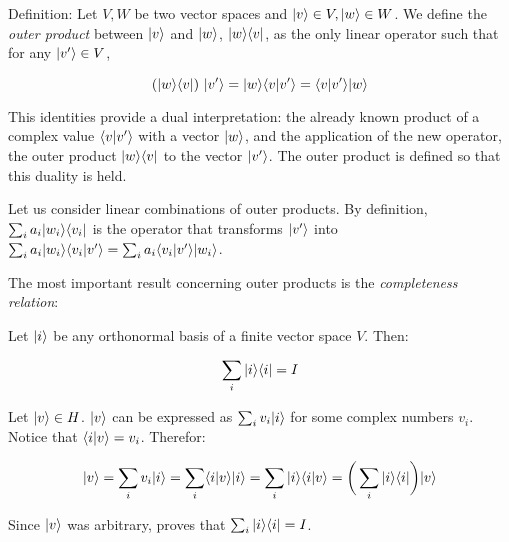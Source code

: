\begin{definition}
	Definition: Let $V, W$ be two vector spaces and $|v\rangle \in V, |w\rangle \in W$. We define the \emph{outer product} between $|v\rangle$ and $|w\rangle$, $|w\rangle\langle v|$, as the only linear operator such that for any $|v'\rangle \in V$, 
	
	$$ (|w\rangle\langle v|) \ |v'\rangle = |w\rangle\langle v|v'\rangle = \langle v|v'\rangle |w\rangle$$
\end{definition}

This identities provide a dual interpretation: the already known product of a complex value $\langle v|v'\rangle$ with a vector $|w\rangle$, and the application of the new operator, the outer product $|w\rangle\langle v|$ to the vector $|v'\rangle$. The outer product is defined so that this duality is held.

Let us consider linear combinations of outer products. By definition, $\sum_i a_i |w_i\rangle\langle v_i|$ is the operator that transforms $|v'\rangle$ into $\sum_i a_i |w_i\rangle\langle v_i|v'\rangle = \sum_i a_i \langle v_i|v'\rangle |w_i\rangle$.

The most important result concerning outer products is the \emph{completeness relation}:

\begin{proposition}
	Let $|i\rangle$ be any orthonormal basis of a finite vector space $V$. Then:
	
	$$ \sum_i |i\rangle\langle i| = I $$
\end{proposition}

\begin{proofs}
	Let $|v\rangle \in H$. $|v\rangle$ can be expressed as $ \sum_i v_i |i\rangle$ for some complex numbers $v_i$. Notice that $\langle i|v\rangle = v_i$. Therefor:
	
	$$|v\rangle = \sum_i v_i |i\rangle = \sum_i \langle i|v\rangle |i\rangle = \sum_i |i\rangle\langle i|v\rangle = \bigg( \sum_i |i\rangle\langle i|\bigg) |v\rangle$$
	
	Since $|v\rangle$ was arbitrary, proves that $ \sum_i |i\rangle\langle i | = I $.
\end{proofs}

